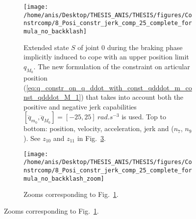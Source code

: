 \begin{figure}[!htbp]
\begin{figure}[!htbp]
\centering
\texttt{[image: /home/anis/Desktop/THESIS\_ANIS/THESIS/figures/Constrcomp/8\_Posi\_constr\_jerk\_comp\_25\_complete\_formula\_no\_backklash]}
\caption{Extended state $S$ of joint $0$ during the braking phase implicitly induced to cope with an upper position limit $q_{M_{0}}$. The new formulation of the constraint on articular position (\ref{eq:q_constr_on_q_ddot_with_const_qdddot_m_const_qdddot_M_1}) that takes into account both the positive and negative jerk capabilities $[\dddot{q}_{m_{0}}, \dddot{q}_{M_{0}}] = [-25, 25]~rad.s^{-3}$ is used. Top to bottom: position, velocity, acceleration, jerk and ($n_7$, $n_9$). See $z_{10}$ and $z_{11}$ in Fig.~\ref{fig:8_Posi_constr_jerk_comp_25_complete_formula_no_backklash_zoom}.} 
\label{fig:8_Posi_constr_jerk_comp_25_complete_formula_no_backklash}
\end{figure}
\begin{figure}[!htbp]
\centering
\texttt{[image: /home/anis/Desktop/THESIS\_ANIS/THESIS/figures/Constrcomp/8\_Posi\_constr\_jerk\_comp\_25\_complete\_formula\_no\_backklash\_zoom]}
\caption{Zooms corresponding to Fig.~\ref{fig:8_Posi_constr_jerk_comp_25_complete_formula_no_backklash}.} 
\label{fig:8_Posi_constr_jerk_comp_25_complete_formula_no_backklash_zoom}
\end{figure}
%

\end{figure}
